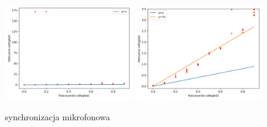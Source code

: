 \begin{frame}
    \begin{figure}
        \centering
        \includegraphics[width=0.49\textwidth]{../pics/mic_sync_dist/dists.png}
        \includegraphics[width=0.49\textwidth]{../pics/mic_sync_dist/dists_close.png}
        \caption{synchronizacja mikrofonowa}
    \end{figure}
\end{frame}